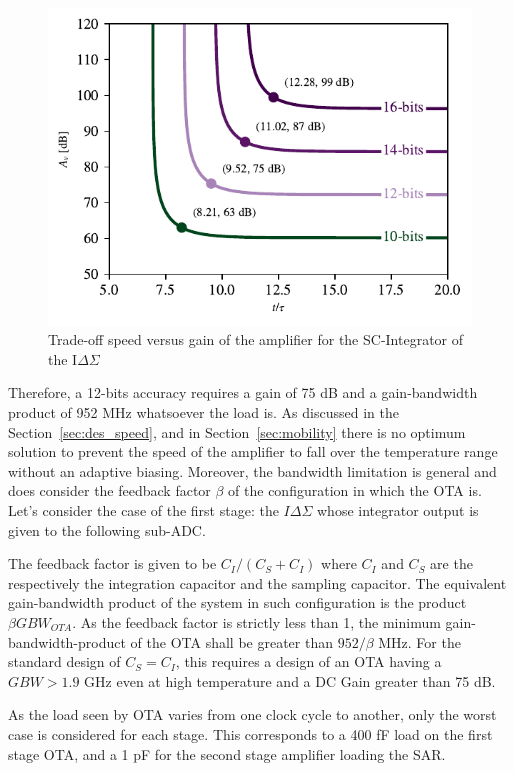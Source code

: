 \begin{figure}[htp]
    \centering
    \includegraphics[width=.75\textwidth]{Chapter7/Figs/ota_spec.pdf}
    \caption{Trade-off speed versus gain of the amplifier for the SC-Integrator of the I\(\Delta\Sigma \)}
    \label{fig:ota_spec_tradeoffs}
\end{figure}

Therefore, a 12-bits accuracy requires a gain of 75 dB and a gain-bandwidth product of 952 MHz whatsoever the load is. As discussed in the Section~\ref{sec:des_speed}, and in Section~\ref{sec:mobility} there is no optimum solution to prevent the speed of the amplifier to fall over the temperature range without an adaptive biasing. Moreover, the bandwidth limitation is general and does consider the feedback factor \(\beta \) of the configuration in which the OTA is. Let's consider the case of the first stage: the \(I\Delta\Sigma \) whose integrator output is given to the following sub-ADC\@.

The feedback factor is given to be \(C_I/(C_S+C_I) \) where \(C_I\) and \(C_S\) are the respectively the integration capacitor and the sampling capacitor. The equivalent gain-bandwidth product of the system in such configuration is the product \(\beta GBW_{OTA}\). As the feedback factor is strictly less than 1, the minimum gain-bandwidth-product of the OTA shall be greater than \(952/\beta \) MHz. For the standard design of \(C_S = C_I \), this requires a design of an OTA having a \(GBW > 1.9 \) GHz even at high temperature and a DC Gain greater than 75 dB.

As the load seen by OTA varies from one clock cycle to another, only the worst case is considered for each stage. This corresponds to a 400 fF load on the first stage OTA, and a 1 pF for the second stage amplifier loading the SAR\@.

